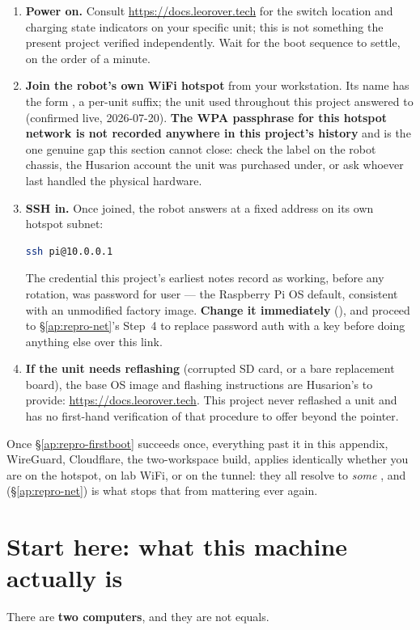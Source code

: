 \begin{enumerate}[leftmargin=1.4em]
\item \textbf{Power on.} Consult
  \url{https://docs.leorover.tech} for the switch location and charging
  state indicators on your specific unit; this is not something the present
  project verified independently. Wait for the boot sequence to settle,
  on the order of a minute.
\item \textbf{Join the robot's own WiFi hotspot} from your workstation. Its
  name has the form , a per-unit suffix; the unit used
  throughout this project answered to 
  (confirmed live, 2026-07-20). \textbf{The WPA passphrase for this hotspot
  network is not recorded anywhere in this project's history} and is the one
  genuine gap this section cannot close: check the label on the robot
  chassis, the Husarion account the unit was purchased under, or ask
  whoever last handled the physical hardware.
\item \textbf{SSH in.} Once joined, the robot answers at a fixed address on
  its own hotspot subnet:
\begin{lstlisting}[language=bash]
ssh pi@10.0.0.1
\end{lstlisting}
  The credential this project's earliest notes record as working, before any
  rotation, was password  for user  --- the
  Raspberry Pi OS default, consistent with an unmodified factory image.
  \textbf{Change it immediately} (), and proceed to
  \S\ref{ap:repro-net}'s Step~4 to replace password auth with a key before
  doing anything else over this link.
\item \textbf{If the unit needs reflashing} (corrupted SD card, or a bare
  replacement board), the base OS image and flashing instructions are
  Husarion's to provide: \url{https://docs.leorover.tech}. This project
  never reflashed a unit and has no first-hand verification of that
  procedure to offer beyond the pointer.
\end{enumerate}

\noindent Once \S\ref{ap:repro-firstboot} succeeds once, everything past it
in this appendix, WireGuard, Cloudflare, the two-workspace build, applies
identically whether you are on the hotspot, on lab WiFi, or on the tunnel:
they all resolve to \emph{some} , and
 (\S\ref{ap:repro-net}) is what stops that from
mattering ever again.

\section{Start here: what this machine actually is}
\label{ap:repro-overview}
There are \textbf{two computers}, and they are not equals.

